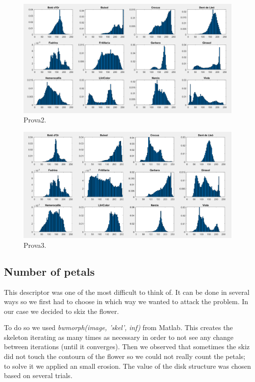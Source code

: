 \documentclass[11]{article}
\begin{document}
\begin{figure}[H]
	\centering
	\includegraphics[scale=0.35]{images/colorHistogram2}
	\caption{Prova2.}
\end{figure}

\begin{figure}[H]
	\centering
	\includegraphics[scale=0.35]{images/colorHistogram3}
	\caption{Prova3.}
\end{figure}

\subsection{Number of petals}

This descriptor was one of the most difficult to think of. It can be done in several ways so we first had to choose in which way we wanted to attack the problem. In our case we decided to skiz the flower.
\medskip

To do so we used \textit{bwmorph(image, 'skel', inf)} from Matlab. This	 creates the skeleton iterating as many times as necessary in order to not see any change between iterations (until it converges). Then we observed that sometimes the skiz did not touch the contourn of the flower so we could not really count the petals; to solve it we applied an small erosion. The value of the disk structure was chosen based on several trials. 
\medskip
\end{document}
